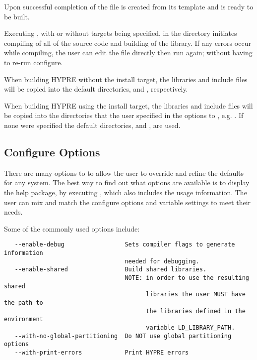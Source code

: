 Upon successful completion of  the file  
is created from its template  and \hypre{} is 
ready to be built.

Executing , with or without targets being specified, in the 
directory initiates compiling of all of the source code and building of the \hypre{} 
library.  If any errors occur while compiling, the user can edit the file 
 directly then run  again; without having to 
re-run configure.

When building HYPRE without the install target, the libraries and include files 
will be copied into the default directories,  and 
, respectively.

When building HYPRE using the install target, the libraries and include files 
will be copied into the directories that the user specified in the options to 
, e.g. .  If none were specified the default 
directories,  and , are used.


\subsection{Configure Options}

There are many options to  to allow the user to override and 
refine the defaults for any system. The best way to find out what options are 
available is to display the help package, by executing , which 
also includes the usage information.  The user can mix and match the configure options 
and variable settings to meet their needs.

Some of the commonly used options include:

\begin{verbatim}
   --enable-debug                 Sets compiler flags to generate information 
                                  needed for debugging.
   --enable-shared                Build shared libraries.
                                  NOTE: in order to use the resulting shared 
                                        libraries the user MUST have the path to
                                        the libraries defined in the environment 
                                        variable LD_LIBRARY_PATH. 
   --with-no-global-partitioning  Do NOT use global partitioning options
   --with-print-errors            Print HYPRE errors
\end{verbatim}

